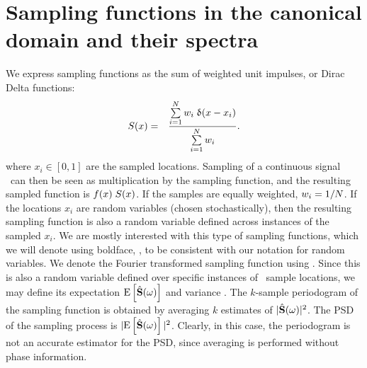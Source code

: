 \section{Sampling functions in the canonical domain and their spectra} \label{sec:sfn}
We express sampling functions as the sum of weighted unit impulses, or Dirac Delta functions:
\begin{eqnarray}
    S(x) &=& \frac { \sum\limits_{i=1}^{N} w_i \; \updelta(x-x_i) } {\sum\limits_{i=1}^{N} w_i }.
\end{eqnarray}
where $x_i \in [0,1]$ are the sampled locations. Sampling of a continuous signal \ifn\ can then be seen as multiplication by the sampling function, and the resulting sampled function is $ f(x) \; S(x)$. If the samples are equally weighted, $w_i = 1/N$. If the locations $x_i$ are random variables (chosen stochastically), then the resulting sampling function is also a random variable defined across instances of the sampled $x_i$. We are mostly interested with this type of sampling functions, which we will denote using boldface, \sfn, to be consistent with our notation for random variables. We denote the Fourier transformed sampling function using \SF. Since this is also a random variable defined over specific instances of \N\ sample locations, we may define its expectation $\mathrm{E} \left[\hat{\mathbf{S}}(\omega) \right]$ and variance \Var{\SF}. The $k$-sample periodogram of the sampling function is obtained by averaging $k$ estimates of $|\hat{\mathbf{S}}(\omega)|^2$. The PSD of the sampling process is $|\mathrm{E} \left[\hat{\mathbf{S}}(\omega) \right]|^2$. Clearly, in this case, the periodogram is not an accurate estimator for the PSD, since averaging is performed without phase information. 



